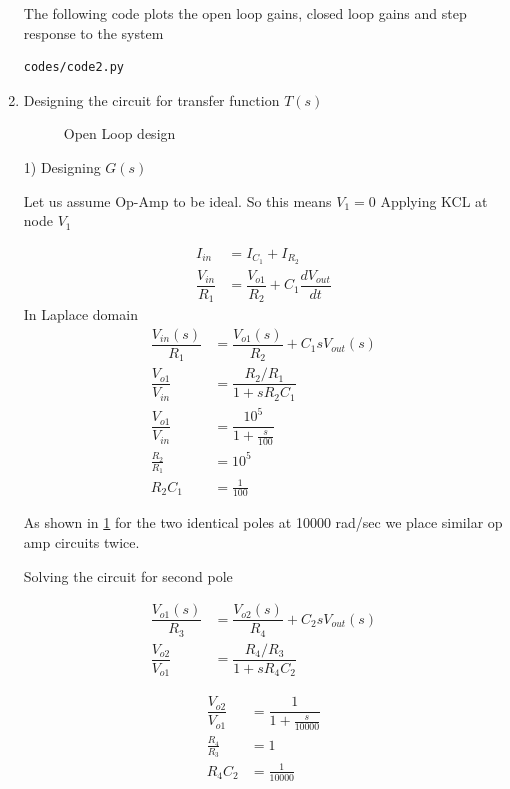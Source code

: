 \begin{enumerate}[label=\thesection.\arabic*.,ref=\thesection.\theenumi]
The following code plots the open loop gains, closed loop gains and step response to the system
\begin{lstlisting}
codes/code2.py
\end{lstlisting}


\item Designing the circuit for transfer function $T(s)$
\begin{figure}[!hbt]
	\begin{center}
			\resizebox{\columnwidth}{!}{}
	\end{center}
\caption{Open Loop design}
\label{fig:equivalent_system1}
\end{figure}

1) Designing $G(s)$

Let us assume Op-Amp to be ideal. So this means $V_{1}=0$
Applying KCL at node $V_{1}$

\begin{align}
I_{in} &= I_{C_{1}} + I_{R_{2}}
\\
\dfrac{V_{in}}{R_{1}} &= \dfrac{V_{o1}}{R_{2}} + C_{1}\dfrac{dV_{out}}{dt}
\end{align}
In Laplace domain
\begin{align}
\dfrac{V_{in}(s)}{R_{1}} &= \dfrac{V_{o1}(s)}{R_{2}} + C_{1}sV_{out}(s)
\\
\dfrac{V_{o1}}{V_{in}} &= \dfrac{R_{2}/R_{1}}{1+sR_{2}C_{1}}
\\
\dfrac{V_{o1}}{V_{in}} &= \dfrac{10^{5}}{1+\frac{s}{100}}
\\
\frac{R_{2}}{R_{1}} &= 10^{5}
\\
R_{2}C_{1} &= \frac{1}{100}
\end{align}

As shown in \ref{fig:equivalent_system1} for the two identical poles at 10000 rad/sec we place similar op amp circuits twice.

Solving the circuit for second pole

\begin{align}
\dfrac{V_{o1}(s)}{R_{3}} &= \dfrac{V_{o2}(s)}{R_{4}} + C_{2}sV_{out}(s)
\\
\dfrac{V_{o2}}{V_{o1}} &= \dfrac{R_{4}/R_{3}}{1+sR_{4}C_{2}}
\end{align}

\begin{align}
\dfrac{V_{o2}}{V_{o1}} &= \dfrac{1}{1+\frac{s}{10000}}
\\
\frac{R_{4}}{R_{3}} &= 1
\\
R_{4}C_{2} &= \frac{1}{10000}
\end{align}




\end{enumerate}

